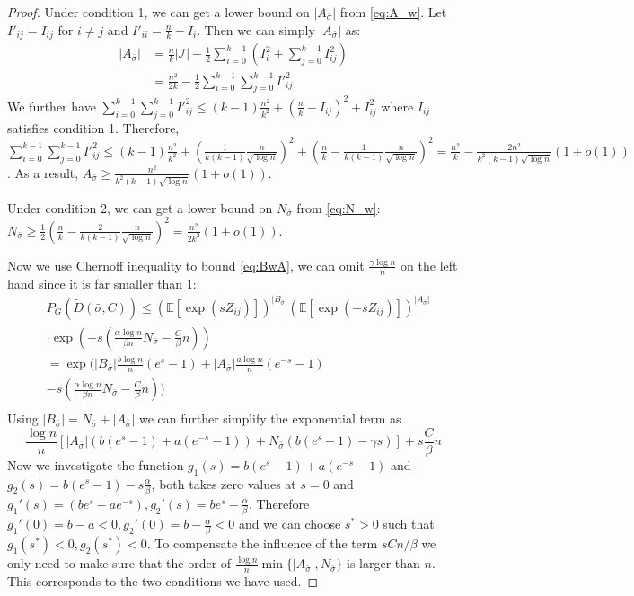 \documentclass[journal]{IEEEtran}
\newcommand{\cI}{\mathcal{I}}
\newcommand{\1}{\mathbbm{1}}
\begin{document}
\begin{proof}
	Under condition 1, we can get a lower bound on $|A_{\bar{\sigma}}|$ from \eqref{eq:A_w}. Let $I'_{ij} = I_{ij}$ for $i\neq j$ and
	$I'_{ii} = \frac{n}{k} - I_i$. Then we can simply $|A_{\bar{\sigma}}|$ as:
	\begin{align*}
	|A_{\bar{\sigma}}| &= \frac{n}{k}|\cI| - \frac{1}{2}\sum_{i=0}^{k-1}  (I^2_i + \sum_{j=0}^{k-1} I^2_{ij}) \\
	&= \frac{n^2}{2k} - \frac{1}{2} \sum_{i=0}^{k-1} \sum_{j=0}^{k-1} I'^2_{ij}
	\end{align*}
	We further have $\sum_{i=0}^{k-1} \sum_{j=0}^{k-1} I'^2_{ij} \leq (k-1)\frac{n^2}{k^2} + (\frac{n}{k} - I_{ij})^2 + I^2_{ij}$ where
	$I_{ij}$ satisfies condition 1. Therefore, $\sum_{i=0}^{k-1} \sum_{j=0}^{k-1} I'^2_{ij} \leq (k-1)\frac{n^2}{k^2} + (\frac{1}{k(k-1)}\frac{n}{\sqrt{\log n}})^2
	+ (\frac{n}{k} - \frac{1}{k(k-1)}\frac{n}{\sqrt{\log n}})^2 = \frac{n^2}{k} - \frac{2n^2}{k^2 (k-1)\sqrt{\log n}}(1+o(1))$.
	As a result, $A_{\bar{\sigma}} \geq \frac{n^2}{k^2 (k-1)\sqrt{\log n}}(1+o(1))$.
	
	Under condition 2, we can get a lower bound on $N_{\bar{\sigma}}$ from \eqref{eq:N_w}: $N_{\bar{\sigma}} \geq \frac{1}{2}(\frac{n}{k} - \frac{2}{k(k-1)}\frac{n}{\sqrt{\log n}})^2 = \frac{n^2}{2k^2}(1+o(1))$.
	
	Now we use Chernoff inequality to bound \eqref{eq:BwA}, we can omit $\frac{\gamma \log n}{n}$ on the left hand since it is far smaller than $1$:
	\begin{align*}
	&P_G(\widetilde{D}(\bar{\sigma}, C))
	\leq (\mathbb{E}[\exp(sZ_{ij})])^{|B_{\bar{\sigma}}|}(\mathbb{E}[\exp(-sZ_{ij})])^{|A_{\bar{\sigma}}|}\\
	&\cdot \exp(-s(\frac{\alpha \log n}{\beta n} N_{\bar{\sigma}}  - \frac{C}{\beta}n)) \\
	& =\exp\Big(|B_{\bar{\sigma}}|\frac{b\log n}{n}(e^s -1) + |A_{\bar{\sigma}}|\frac{a\log n}{n} (e^{-s} - 1) \\
	&-s(\frac{\alpha \log n}{\beta n} N_{\bar{\sigma}}  - \frac{C}{\beta}n)\Big) \\
	\end{align*}
	Using $|B_{\bar{\sigma}}| = N_{\bar{\sigma}} + |A_{\bar{\sigma}}|$ we can further simplify the exponential term as
	$$
	\frac{\log n}{n} [|A_{\bar{\sigma}}|(b(e^s -1)+ a(e^{-s} - 1)) +
	N_{\bar{\sigma}} (b(e^s - 1)-\gamma s)]  + s \frac{C}{\beta}n
	$$
	Now we investigate the function $g_1(s) = b(e^s -1)+ a(e^{-s} - 1)$ and $g_2(s) = b(e^s - 1)-s\frac{\alpha}{\beta}$,
	both takes zero values at $s=0$ and $g_1'(s) = (be^s - ae^{-s}), g_2'(s) = be^s -\frac{\alpha}{\beta}$.
	Therefore $g_1'(0) = b-a<0, g_2'(0) = b - \frac{\alpha}{\beta} < 0$ and we can choose $s^*>0$ such that $g_1(s^*) < 0,g_2(s^*) < 0$.
	To compensate the influence of the term $sCn/\beta$ we only need to make sure that the order of $\frac{\log n}{n} \min\{|A_{\bar{\sigma}}|, N_{\bar{\sigma}}\}$ is larger than $n$.
	This corresponds to the two conditions we have used.
\end{proof}
\end{document}
